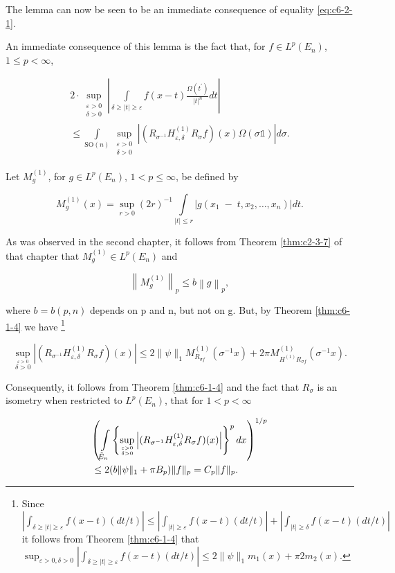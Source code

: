 The lemma can now be seen to be an immediate consequence of equality \eqref{eq:c6-2-1}.

An immediate consequence of this lemma is the fact that, for $f \in L^p(E_n)$, $1 \leq p < \infty$,

\begin{equation}\label{eq:c6-2-3}
\begin{aligned}2\cdot\sup_{\substack{\varepsilon>0\\ \delta>0}}\left|\int\limits_{\delta\geq|t|\geq\varepsilon}f(x-t)\frac{\Omega(t^{\prime})}{|t|^{n}}dt\right|\\\leq\int\limits_{\mathrm{SO}(n)}\sup_{\substack{\varepsilon>0\\ \delta>0}}\left|(R_{\sigma^{-1}}H^{(1)}_{\varepsilon,\delta}R_{\sigma}f)(x)\Omega(\sigma\mathbb{1})\right|d\sigma.\end{aligned}
\end{equation}

Let $M_g^{(1)}$, for $g \in L^p(E_n)$, $1 < p \leq \infty$, be defined by

\[
M_{g}^{(1)}(x)=\sup_{r>0}\left(2r\right)^{-1}\int\limits_{|t|\leq r}\left|g(x_{1}\;-\;t,x_{2},\ldots,x_{n})\right|d t.
\]

As was observed in the second chapter, it follows from Theorem \ref{thm:c2-3-7} of that chapter that $M_g^{(1)} \in L^p(E_n)$ and

\[
\left\|M_{g}^{(1)}\right\|_{p}\leq b\left\|g\right\|_{p},
\]

where $b = b(p, n)$ depends on p and n, but not on g. But, by Theorem \ref{thm:c6-1-4} we have \footnote{Since $|\int_{\delta\geq|t|\geq\varepsilon}f(x-t)(dt/t)|\leq|\int_{|t|\geq\varepsilon}f(x-t)(dt/t)|+|\int_{|t|\geq\delta}f(x-t)(dt/t)|$ it follows from Theorem \ref{thm:c6-1-4} that $\sup_{\varepsilon>0,\delta>0}|\int_{\delta\geq|t|\geq\varepsilon}f(x-t)(dt/t)|\leq2\|\psi\|_{1}m_1(x)+\pi2m_2(x)$.}

\[
\sup_{\stackrel{\varepsilon>0}{\delta>0}}\left|(R_{\sigma^{-1}}H_{\varepsilon,\delta}^{(1)}R_{\sigma}f)(x)\right|\leq2\|\psi\|_{1}M_{R_{\sigma f}}^{(1)}(\sigma^{-1}x)+2\pi M_{H^{(1)}R_{\sigma f}}^{(1)}(\sigma^{-1}x).
\]

Consequently, it follows from Theorem \ref{thm:c6-1-4} and the fact that $R_\sigma$ is an isometry when restricted to $L^p(E_n)$, that for $1 < p < \infty$

\begin{equation}\label{eq:c6-2-4}
\begin{aligned}&{\left(\intop_{\tilde{E}_{n}}\left\{\sup_{\varepsilon>0\atop\delta>0}\left|(R_{\sigma^{-1}}H_{\varepsilon,\delta}^{(1)}R_{\sigma}f)(x)\right|\right\}^{p}d x\right)^{1/p}}\\&\leq2(b\|\psi\|_{1}+\pi B_{p})\|f\|_{p}=C_{p}\|f\|_{p}.\end{aligned}
\end{equation}

